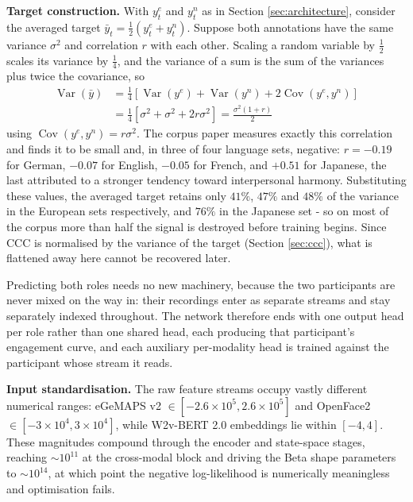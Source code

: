 \documentclass[10pt,a4paper,twocolumn]{article}
\begin{document}
	\textbf{Target construction.} With $y^{e}_t$ and $y^{n}_t$ as in Section \ref{sec:architecture}, consider the averaged target $\bar{y}_t = \tfrac{1}{2}(y^{e}_t + y^{n}_t)$. Suppose both annotations have the same variance $\sigma^2$ and correlation $r$ with each other. Scaling a random variable by $\tfrac{1}{2}$ scales its variance by $\tfrac{1}{4}$, and the variance of a sum is the sum of the variances plus twice the covariance, so
	$$\begin{aligned}\operatorname{Var}(\bar{y}) &= \tfrac{1}{4}\left[\operatorname{Var}(y^{e}) + \operatorname{Var}(y^{n}) + 2\operatorname{Cov}(y^{e}, y^{n})\right] \\ &= \tfrac{1}{4}\left[\sigma^2 + \sigma^2 + 2r\sigma^2\right] = \frac{\sigma^2(1+r)}{2}\end{aligned}$$
	using $\operatorname{Cov}(y^{e}, y^{n}) = r\sigma^2$. 
	The corpus paper \cite{funk2024noxij} measures exactly this correlation and finds it to be small and, in three of four language sets, negative: $r = -0.19$ for German, $-0.07$ for English, $-0.05$ for French, and $+0.51$ for Japanese, the last attributed to a stronger tendency toward interpersonal harmony. Substituting these values, the averaged target retains only $41\%$, $47\%$ and $48\%$ of the variance in the European sets respectively, and $76\%$ in the Japanese set - so on most of the corpus more than half the signal is destroyed before training begins.
	Since CCC is normalised by the variance of the target (Section \ref{sec:ccc}), what is flattened away here cannot be recovered later.
	
	Predicting both roles needs no new machinery, because the two participants are never mixed on the way in: their recordings enter as separate streams and stay separately indexed throughout. The network therefore ends with one output head per role rather than one shared head, each producing that participant's engagement curve, and each auxiliary per-modality head is trained against the participant whose stream it reads. 

	\textbf{Input standardisation.}
	The raw feature streams occupy vastly different numerical ranges: eGeMAPS v2 $\in [-2.6 \times 10^5, 2.6 \times 10^5]$ and OpenFace2 $\in [-3 \times10^4, 3 \times 10^4]$, while W2v-BERT 2.0 embeddings lie within $[-4, 4]$. These magnitudes compound through the encoder and state-space stages, reaching $\sim 10^{11}$ at the cross-modal block and driving the Beta shape parameters to $\sim 10^{14}$, at which point the negative log-likelihood is numerically meaningless and optimisation fails.
\end{document}
